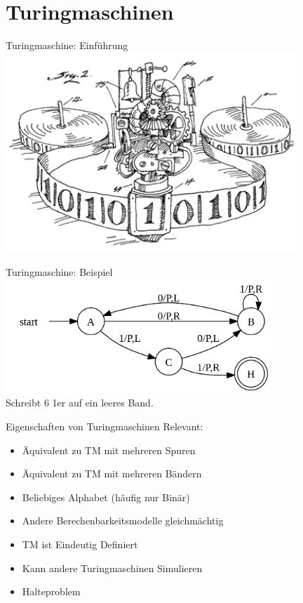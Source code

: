 \section{Turingmaschinen}

\begin{frame}[c]{Turingmaschine: Einführung}
    \includegraphics[width=11cm]{proseminar/images/turing-machine.png}
\end{frame}


\begin{frame}[c]{Turingmaschine: Beispiel}
    \includegraphics[width=10cm]{proseminar/images/tm-ex1.png} \\
    Schreibt 6 1er auf ein leeres Band.
\end{frame}


\begin{frame}[c]{Eigenschaften von Turingmaschinen}
    Relevant:
    \begin{itemize}
            \pause
        \item Äquivalent zu TM mit mehreren Spuren 
            \pause
        \item Äquivalent zu TM mit mehreren Bändern
            \pause
        \item Beliebiges Alphabet (häufig nur Binär)
            \pause
        \item Andere Berechenbarkeitsmodelle gleichmächtig
            \pause
        \item TM ist Eindeutig Definiert
            \pause
        \item Kann andere Turingmaschinen Simulieren
            \pause
        \item Halteproblem
    \end{itemize}
\end{frame}


